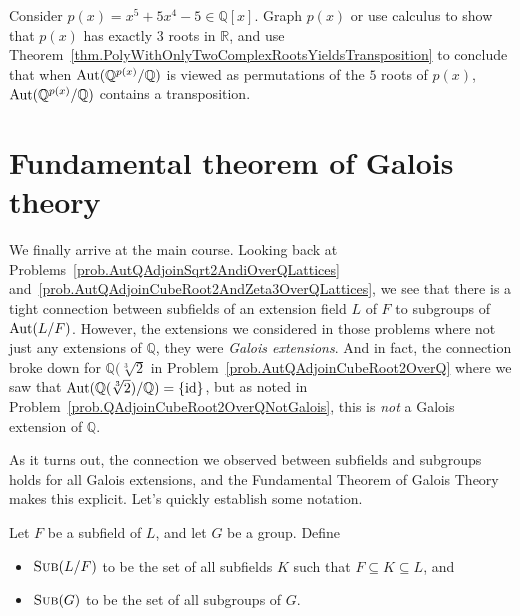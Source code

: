 \begin{problem}\label{prob.AutSplittingFieldx55x45ContainsTransposition}
Consider $p(x) = x^5 +5x^4-5 \in \mathbb{Q}[x]$. Graph $p(x)$ or use calculus to show that $p(x)$ has exactly $3$ roots  in $\mathbb{R}$, and use Theorem~\ref{thm.PolyWithOnlyTwoComplexRootsYieldsTransposition} to conclude that when $\operatorname{Aut}(\mathbb{Q}^{p(x)}/\mathbb{Q})$ is viewed as permutations of the $5$ roots of $p(x)$, $\operatorname{Aut}(\mathbb{Q}^{p(x)}/\mathbb{Q})$ contains a transposition.
\end{problem}

\section{Fundamental theorem of Galois theory}

We finally arrive at the main course. Looking back at Problems~\ref{prob.AutQAdjoinSqrt2AndiOverQLattices} and~\ref{prob.AutQAdjoinCubeRoot2AndZeta3OverQLattices}, we see that there is a tight connection between subfields of an extension  field $L$ of $F$ to subgroups of $\operatorname{Aut}(L/F)$. However, the extensions we considered in those problems where not just any extensions of $\mathbb{Q}$, they were \emph{Galois extensions}. And in fact, the connection broke down for $\mathbb{Q}(\sqrt[3]{2}$ in Problem~\ref{prob.AutQAdjoinCubeRoot2OverQ} where we saw that $\operatorname{Aut}(\mathbb{Q}(\sqrt[3]{2})/\mathbb{Q}) = \{\text{id}\}$, but as noted in  Problem~\ref{prob.QAdjoinCubeRoot2OverQNotGalois}, this is \emph{not} a Galois extension of $\mathbb{Q}$. 

As it turns out, the connection we observed between subfields and subgroups holds for all Galois extensions, and the Fundamental Theorem of Galois Theory makes this explicit. Let's quickly establish some notation.

\begin{notation}
Let $F$ be a subfield of $L$, and let $G$ be a group. Define 
\begin{itemize}
\item $\operatorname{\textsc{Sub}}(L/F)$ to be the set of all subfields $K$ such that $F\subseteq K\subseteq L$, and 
\item $\operatorname{\textsc{Sub}}(G)$ to be the set of all subgroups of  $G$.
\end{itemize}
\end{notation}

